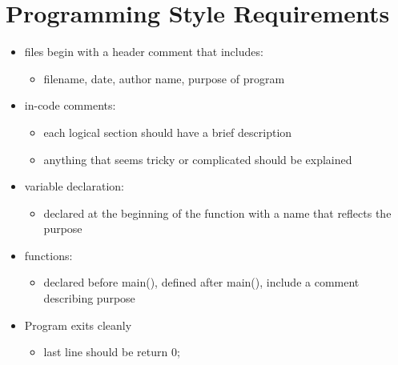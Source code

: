 \documentclass{article}
\begin{document}
\section*{Programming Style Requirements}
\begin{itemize}
	\item files begin with a header comment that includes:
	\begin{itemize}
		\item filename, date, author name, purpose of program
	\end{itemize}
	\item in-code comments:
	\begin{itemize}
		\item each logical section should have a brief description
		\item anything that seems tricky or complicated should be explained
	\end{itemize}
	\item variable declaration:
	\begin{itemize}
		\item declared at the beginning of the function with a name that reflects the purpose
	\end{itemize}
	\item functions:
	\begin{itemize}
		\item declared before main(), defined after main(), include a comment describing purpose
	\end{itemize}
	\item Program exits cleanly
	\begin{itemize}
		\item last line should be return 0;
	\end{itemize}
\end{itemize}
\end{document}
